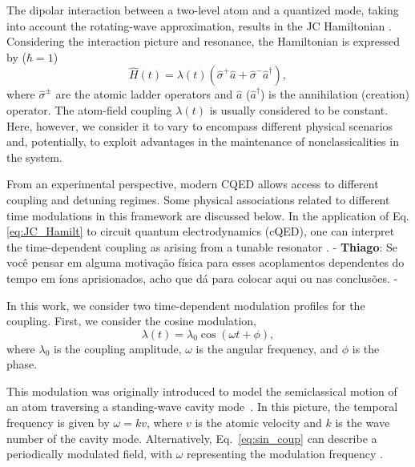 \documentclass[aps,pre,superscriptaddress,twocolumn,10pt]{revtex4-2}
\newcommand{\ts}[1]{{\color{red}- \textbf{Thiago}: #1 - }}
\begin{document}
The dipolar interaction between a two-level atom and a quantized mode, taking into account the rotating-wave approximation, results in the JC Hamiltonian \cite{Scully1997,GERRY2005}.
Considering the interaction picture and resonance, the Hamiltonian is expressed by ($\hbar=1$)
\begin{equation} 
\label{eq:JC_Hamilt}
    \hat{H}(t) = 
      \lambda(t) ( \hat{\sigma}^{+}\hat{a} +
    \hat{\sigma}^{-}\hat{a}^{\dagger}), 
\end{equation}
where $\hat{\sigma}^{\pm}$ are the atomic ladder operators and $\hat{a}$ ($\hat{a}^\dagger$) is  the annihilation (creation) operator.
The atom-field coupling $\lambda(t)$ is usually considered to be constant. 
Here, however, we consider it to vary to encompass different physical scenarios and, potentially, to exploit advantages in the maintenance of nonclassicalities in the system.

From an experimental perspective, modern CQED allows access to different coupling \cite{LARSON2021} and detuning \cite{Brune1996,Sayrin2011} regimes. Some physical associations related to different time modulations in this framework are discussed below.
In the application of Eq. \eqref{eq:JC_Hamilt} to circuit quantum electrodynamics (cQED), one can interpret the time-dependent coupling as arising from a tunable resonator \cite{Maldonado-Mundo2012,Yamamoto2008,Gambetta2011,Srinivasan2011,Yin2013,Srinivasan2014,Zeytinoglu2015}.
\ts{Se você pensar em alguma motivação física para esses acoplamentos dependentes do tempo em íons aprisionados, acho que dá para colocar aqui ou nas conclusões.}


In this work, we consider two time-dependent modulation profiles for the coupling.
First, we consider the cosine modulation,
\begin{equation}
    \lambda(t)=\lambda_0\cos(\omega t+\phi),
    \label{eq:sin_coup}
\end{equation}
where $\lambda_0$ is the coupling amplitude, $\omega$ is the angular frequency, and $\phi$ is the phase.

This modulation was originally introduced to model the semiclassical motion of an atom traversing a standing-wave cavity mode~\cite{Schlicher1989,Wilkens1992,Fang1998,Joshi2004}.
In this picture, the temporal frequency is given by $\omega=kv$, where $v$ is the atomic velocity and $k$ is the wave number of the cavity mode.
Alternatively, Eq.~\eqref{eq:sin_coup} can describe a periodically modulated field, with $\omega$ representing the modulation frequency \cite{Maldonado-Mundo2012}.
\end{document}
